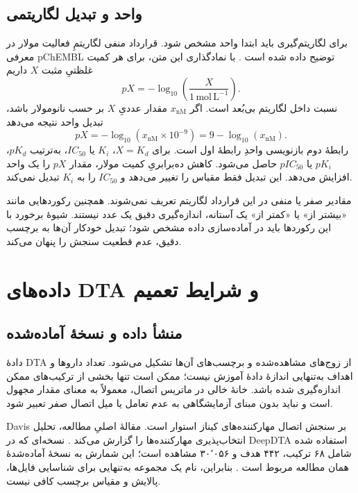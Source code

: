 \subsection{واحد و تبدیل لگاریتمی}
برای لگاریتم‌گیری باید ابتدا واحد مشخص شود. قرارداد منفی لگاریتمِ فعالیت مولار در معرفی pChEMBL توضیح داده شده است \cite{Bento14ChEMBL}. با نمادگذاری این متن، برای هر کمیت غلظتیِ مثبت $X$ داریم
\begin{equation}
pX=-\log_{10}\!\left(\frac{X}{1\,\mathrm{mol\,L^{-1}}}\right).
\label{eq:log-affinity}
\end{equation}
نسبت داخل لگاریتم بی‌بُعد است. اگر $x_{\mathrm{nM}}$ مقدار عددیِ $X$ بر حسب نانومولار باشد، تبدیل واحد نتیجه می‌دهد
\begin{equation}
pX=-\log_{10}(x_{\mathrm{nM}}\times10^{-9})
=9-\log_{10}(x_{\mathrm{nM}}).
\label{eq:nm-affinity}
\end{equation}
رابطهٔ دوم بازنویسی واحدِ رابطهٔ اول است. برای $X=K_d$، $K_i$ یا $IC_{50}$، به‌ترتیب $pK_d$، $pK_i$ یا $pIC_{50}$ حاصل می‌شود. کاهش ده‌برابریِ کمیت مولار، مقدار $pX$ را یک واحد افزایش می‌دهد. این تبدیل فقط مقیاس را تغییر می‌دهد و $IC_{50}$ را به $K_i$ تبدیل نمی‌کند.

مقادیر صفر یا منفی در این قرارداد لگاریتم تعریف نمی‌شوند. همچنین رکوردهایی مانند «بیشتر از» یا «کمتر از» یک آستانه، اندازه‌گیری دقیق یک عدد نیستند. شیوهٔ برخورد با این رکوردها باید در آماده‌سازی داده مشخص شود؛ تبدیل خودکار آن‌ها به برچسب دقیق، عدم قطعیت سنجش را پنهان می‌کند.

\section{داده‌های DTA و شرایط تعمیم}
\label{sec:data-dta}
\subsection{منشأ داده و نسخهٔ آماده‌شده}
دادهٔ DTA از زوج‌های مشاهده‌شده و برچسب‌های آن‌ها تشکیل می‌شود. تعداد داروها و اهداف به‌تنهایی اندازهٔ دادهٔ آموزش نیست؛ ممکن است تنها بخشی از ترکیب‌های ممکن اندازه‌گیری شده باشد. خانهٔ خالی در ماتریس اتصال، معمولاً به معنای مقدار مجهول است و نباید بدون مبنای آزمایشگاهی به عدم تعامل یا میل اتصال صفر تعبیر شود.

Davis بر سنجش اتصال مهارکننده‌های کیناز استوار است. مقالهٔ اصلیِ مطالعه، تحلیل انتخاب‌پذیری مهارکننده‌ها را گزارش می‌کند \cite{Davis11Kinase}. نسخه‌ای که در DeepDTA استفاده شده شامل ۶۸ ترکیب، ۴۴۲ هدف و ۳۰٬۰۵۶ مشاهده است؛ این شمارش به نسخهٔ آماده‌شدهٔ همان مطالعه مربوط است \cite{Ozturk18DeepDTA}. بنابراین، نام یک مجموعه به‌تنهایی برای شناسایی فایل‌ها، پالایش و مقیاس برچسب کافی نیست.

